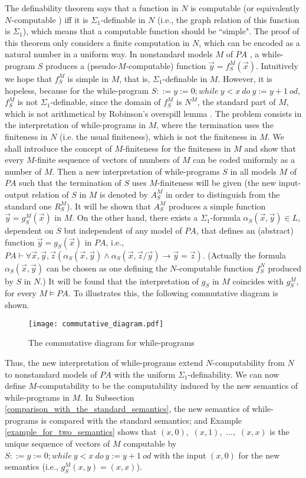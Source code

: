 \documentclass[a4paper,11pt]{article}
\begin{document}
The definability theorem \cite[Chapter 16]{c. and l.} says that a function in $N$ is computable (or equivalently $N$-computable \cite{rogers_1}) iff it is $\Sigma_1$-definable in $N$ (i.e., the graph relation of this function is $\Sigma_1$), which means that a computable function should be ``simple". The proof of this theorem only considers a finite computation in $N$, which can be encoded as a natural number in a uniform way. In nonstandard models $M$ of $PA$ \cite{model_1}, a while-program $S$ produces a (pseudo-$M$-computable) function $\vec{y} = f_S^M(\vec{x})$. Intuitively we hope that $f_S^M$ is simple in $M$, that is, $\Sigma_1$-definable in $M$. However, it is hopeless, because for the while-program $S ::= y:=0; while\ y<x\ do\ y:=y+1\ od$, $f_S^M$ is not $\Sigma_1$-definable, since the domain of $f_S^M$ is $N^M$, the standard part of $M$, which is not arithmetical by Robinson's overspill lemma \cite[Lemma 25.8]{c. and l.}. The problem consists in the interpretation of while-programs in $M$, where the termination uses the finiteness in $N$ (i.e. the usual finiteness), which is not the finiteness in $M$. We shall introduce the concept of $M$-finiteness for the finiteness in $M$ and show that every $M$-finite sequence of vectors of numbers of $M$ can be coded uniformly as a number of $M$. Then a new interpretation of while-programs $S$ in all models $M$ of $PA$ such that the termination of $S$ uses $M$-finiteness will be given (the new input-output relation of $S$ in $M$ is denoted by $A_S^M$ in order to distinguish from the standard one $R_S^M$). It will be shown that $A_S^M$ produces a simple function $\vec{y} = g_S^M(\vec{x})$ in $M$. On the other hand, there exists a $\Sigma_1$-formula $\alpha_S(\vec{x},\vec{y})\in L$, dependent on $S$ but independent of any model of $PA$, that defines an (abstract) function $\vec{y} = g_S(\vec{x})$ in $PA$, i.e., $PA\vdash \forall \vec{x},\vec{y},\vec{z} ( \alpha_S(\vec{x},\vec{y}) \wedge \alpha_S(\vec{x},\vec{z}/\vec{y}) \rightarrow \vec{y} = \vec{z} )$. (Actually the formula $\alpha_S(\vec{x},\vec{y})$ can be chosen as one defining the $N$-computable function $f_S^N$ produced by $S$ in $N$.) It will be found that the interpretation of $g_S$ in $M$ coincides with $g_S^M$, for every $M\models PA$. To illustrates this, the following commutative diagram is shown.
\begin{figure}[!ht]
  \centering
  \texttt{[image: commutative\_diagram.pdf]}\\
  \caption{The commutative diagram for while-programs}\label{commutative_diagram}
\end{figure}
Thus, the new interpretation of while-programs extend $N$-computability from $N$ to nonstandard models of $PA$ with the uniform $\Sigma_1$-definability. We can now define $M$-computability to be the computability induced by the new semantics of while-programs in $M$. In Subsection \ref{comparison_with_the_standard_semantics}, the new semantics of while-programs is compared with the standard semantics; and Example \ref{example_for_two_semantics} shows that $(x,0),$ $(x,1),$ $\ldots,$ $(x,x)$ is the unique sequence of vectors of $M$ computable by $S ::= y:=0; while\ y<x\ do\ y:=y+1\ od$ with the input $(x,0)$ for the new semantics (i.e., $g_S^M(x,y) = (x,x)$).
\end{document}
